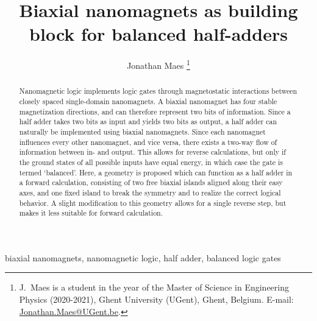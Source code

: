\documentclass[twocolumn]{phdsymp}
\begin{document}
\title{Biaxial nanomagnets as building block for balanced half-adders}

\author{Jonathan Maes \thanks{J.~Maes is a student in the  year of the Master of Science in Engineering Physics (2020-2021), Ghent University (UGent), Ghent, Belgium. E-mail: \href{mailto:Jonathan.Maes@UGent.be}{Jonathan.Maes@UGent.be}.}}


\maketitle

\begin{abstract}
Nanomagnetic logic implements logic gates through magnetostatic interactions between closely spaced single-domain nanomagnets. A biaxial nanomagnet has four stable magnetization directions, and can therefore represent two bits of information. Since a half adder takes two bits as input and yields two bits as output, a half adder can naturally be implemented using biaxial nanomagnets. Since each nanomagnet influences every other nanomagnet, and vice versa, there exists a two-way flow of information between in- and output. This allows for reverse calculations, but only if the ground states of all possible inputs have equal energy, in which case the gate is termed `balanced'. Here, a geometry is proposed which can function as a half adder in a forward calculation, consisting of two free biaxial islands aligned along their easy axes, and one fixed island to break the symmetry and to realize the correct logical behavior. A slight modification to this geometry allows for a single reverse step, but makes it less suitable for forward calculation.
\end{abstract}

\begin{keywords}
biaxial nanomagnets, nanomagnetic logic, half adder, balanced logic gates
\end{keywords}
\end{document}
